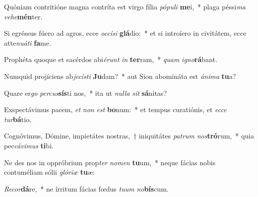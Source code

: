 \item Quóniam contritióne magna contríta est virgo fília \textit{pó}\textit{pu}\textit{li} \textbf{me}i,~* plaga péssi\textit{ma} \textit{ve}\textit{he}\textbf{mén}ter.
\item Si egréssus fúero ad agros, ecce \textit{oc}\textit{cí}\textit{si} \textbf{glá}dio:~* et si introíero in civitátem, ecce atte\textit{nu}\textit{á}\textit{ti} \textbf{fa}me.
\item Prophéta quoque et sacérdos abi\textit{é}\textit{runt} \textit{in} \textbf{ter}ram,~* \textit{quam} \textit{i}\textit{gno}\textbf{rá}bant.
\item Numquid projíciens ab\textit{je}\textit{cís}\textit{ti} \textbf{Ju}dam?~* aut Sion abomináta est \textit{á}\textit{ni}\textit{ma} \textbf{tu}a?
\item Quare er\textit{go} \textit{per}\textit{cus}\textbf{sís}ti nos,~* ita ut \textit{nul}\textit{la} \textit{sit} \textbf{sá}nitas?
\item Exspectávimus pacem, \textit{et} \textit{non} \textit{est} \textbf{bo}num:~* et tempus curatiónis, et \textit{ec}\textit{ce} \textit{tur}\textbf{bá}tio.
\item Cognóvimus, Dómine, impietátes nostras,~† iniquitátes \textit{pa}\textit{trum} \textit{nos}\textbf{tró}rum,~* quia pec\textit{cá}\textit{vi}\textit{mus} \textbf{ti}bi.
\item Ne des nos in oppróbrium prop\textit{ter} \textit{no}\textit{men} \textbf{tu}um,~* neque fácias nobis contuméliam sólii \textit{gló}\textit{ri}\textit{æ} \textbf{tu}æ:
\item \textit{Re}\textit{cor}\textbf{dá}re,~* ne írritum fácias fœdus \textit{tu}\textit{um} \textit{no}\textbf{bís}cum.
